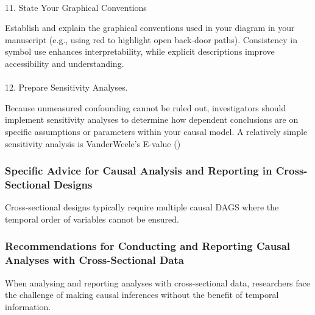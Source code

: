 \documentclass[
  singlecolumn]{article}
\makeatletter
\let\oldparagraph\paragraph
\renewcommand{\paragraph}{
    \@ifstar
      \xxxParagraphStar
      \xxxParagraphNoStar
  }
\newcommand{\xxxParagraphStar}[1]{\oldparagraph*{#1}\mbox{}}
\newcommand{\xxxParagraphNoStar}[1]{\oldparagraph{#1}\mbox{}}
\makeatother
\begin{document}
\paragraph{11. State Your Graphical
Conventions}\label{state-your-graphical-conventions}

Establish and explain the graphical conventions used in your diagram in
your manuscript (e.g., using red to highlight open back-door paths).
Consistency in symbol use enhances interpretability, while explicit
descriptions improve accessibility and understanding.

\paragraph{12. Prepare Sensitivity
Analyses.}\label{prepare-sensitivity-analyses.}

Because unmeasured confounding cannot be ruled out, investigators should
implement sensitivity analyses to determine how dependent conclusions
are on specific assumptions or parameters within your causal model. A
relatively simple sensitivity analysis is VanderWeele's E-value
()

\subsubsection{Specific Advice for Causal Analysis and Reporting in
Cross-Sectional
Designs}\label{specific-advice-for-causal-analysis-and-reporting-in-cross-sectional-designs}

\begin{table}

\caption{\label{tbl-cs}Cross-sectional designs typically require
multiple causal DAGS where the temporal order of variables cannot be
ensured.}

\centering{

\examplecrosssection

}

\end{table}%

\subsubsection{Recommendations for Conducting and Reporting Causal
Analyses with Cross-Sectional
Data}\label{recommendations-for-conducting-and-reporting-causal-analyses-with-cross-sectional-data}

When analysing and reporting analyses with cross-sectional data,
researchers face the challenge of making causal inferences without the
benefit of temporal information.
\end{document}
